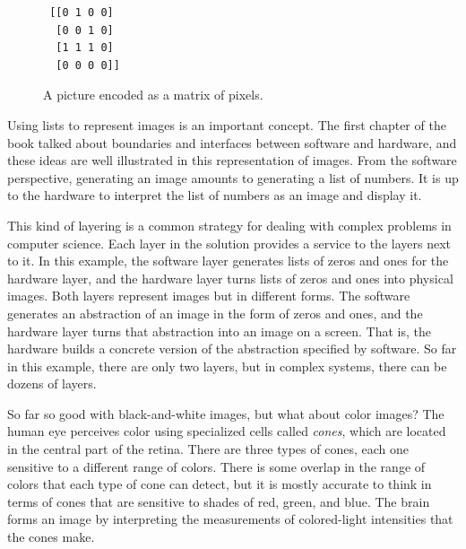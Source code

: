 \begin{figure}
\begin{center}
\begin{minipage}{3cm}
\begin{code}
\begin{verbatim}
 [[0 1 0 0]
  [0 0 1 0]
  [1 1 1 0]
  [0 0 0 0]]
\end{verbatim}
\end{code}
\end{minipage}%
\begin{minipage}{3cm}
\end{minipage}
\end{center}
\caption{A picture encoded as a matrix of pixels.}
\label{fig:glider-in-images}
\end{figure}

Using lists to represent images is an important concept.
The first chapter of the book talked about boundaries
and interfaces between software and hardware, and these ideas are
well illustrated in this representation of images.
From the software perspective,
generating an image amounts to generating a list of numbers.
It is up to the hardware to interpret the list of numbers
as an image and display it.

This kind of layering is a common strategy for dealing
with complex problems in computer science.
Each layer in the solution provides a service
to the layers next to it. In this example,
the software layer generates lists of zeros and ones
for the hardware layer, and
the hardware layer turns lists of zeros and ones into physical images.
Both layers represent images but in different forms.
The software generates an abstraction of an image
in the form of zeros and ones,
and the hardware layer turns that abstraction into an
image on a screen. That is, the hardware builds a
concrete version of the abstraction specified by software.
So far in this example, there are only two layers,
but in complex systems, there can be dozens of layers.

So far so good with black-and-white images,
but what about color images?
The human eye perceives
color using specialized cells called \emph{cones}, 
which are located in the central
part of the retina. There are three types of cones, each one sensitive
to a different range of colors. There is some overlap in the range
of colors that each type of cone can detect, but it is mostly accurate
to think in terms of cones that are sensitive to shades of red, green,
and blue. The brain forms an image by interpreting
the measurements of colored-light intensities that the cones make.

